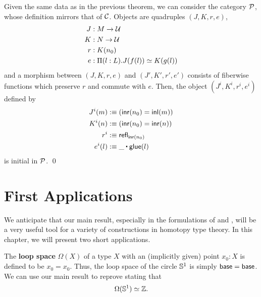 \begin{thm} \label{thm:paths-mainresult-pushout-based}
 Given the same data as in the previous theorem, we can consider the category $\mathcal P$,
 whose definition mirrors that of $\mathcal C$.
 Objects are quadruples $(J,K,r,e)$,
 \begin{align*}
  J &: M \to \mathcal{U} \\
  K &: N \to \mathcal{U} \\
  r &: K(n_0) \\
  e &: \Pi (l : L). J(f(l)) \simeq K(g(l))
 \end{align*}
and a morphism between $(J,K,r,e)$ and $(J',K',r',e')$ consists of fiberwise
functions which preserve $r$ and commute with $e$. %
  Then, the object $(J^i,K^i,r^i,e^i)$ defined by
 \begin{align*}
  J^i(m) &:\equiv \left(\inr(n_0) = \inl(m)\right) \\
  K^i(n) &:\equiv \left(\inr(n_0) = \inr(n)\right) \\
  r^i &:\equiv \refl_{\inr(n_0)} \\
  e^i(l) &:\equiv \_ \ct \glue(l)
 \end{align*}
is initial in $\mathcal P$. \qed
\end{thm}

\section{First Applications}\label{sec:paths-applications}

We anticipate that our main result, especially in the formulations of
 and ,
will be a very useful tool for a variety of constructions
in homotopy type theory.
In this chapter, we will present two short applications.

The \textbf{loop space} $\Omega(X)$ of a type $X$ with an (implicitly given)
point $x_0 : X$ is defined to be $x_0 = x_0$.
Thus, the loop space of the circle $\mathbb{S}^1$ is simply
$\mathsf{base} = \mathsf{base}$.
We can use our main result to reprove  stating that
\begin{equation*}
\Omega(\mathbb{S}^1) \simeq \mathbb Z \text{.}
\end{equation*}


